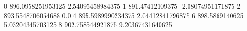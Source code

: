 0 896.0958251953125 2.54095458984375
1 891.47412109375 -2.08074951171875
2 893.5548706054688 0.0
4 895.5989990234375 2.04412841796875
6 898.5869140625 5.03204345703125
8 902.758544921875 9.20367431640625
